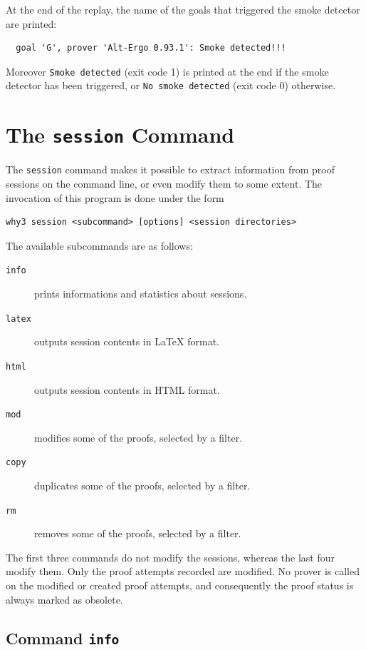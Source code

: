 At the end of the replay, the name of the goals that triggered the
smoke detector are printed:
\begin{verbatim}
  goal 'G', prover 'Alt-Ergo 0.93.1': Smoke detected!!!
\end{verbatim}
Moreover \texttt{Smoke detected} (exit code 1) is printed at the end
if the smoke detector has been triggered, or \texttt{No smoke
  detected} (exit code 0) otherwise.



\section{The \texttt{session} Command}
\label{sec:why3session}

The \texttt{session} command makes it possible to extract information from
proof sessions on the command line, or even modify them to some
extent. The invocation of this program is done under the form
\begin{verbatim}
why3 session <subcommand> [options] <session directories>
\end{verbatim}
The available subcommands are as follows:
\begin{description}
\item[\texttt{info}] prints informations and statistics about sessions.
\item[\texttt{latex}] outputs session contents in LaTeX format.
\item[\texttt{html}] outputs session contents in HTML format.
\item[\texttt{mod}] modifies some of the proofs, selected by a filter.
\item[\texttt{copy}] duplicates some of the proofs, selected by a filter.
\item[\texttt{rm}] removes some of the proofs, selected by a filter.
\end{description}

The first three commands do not modify the sessions, whereas the last
four modify them. Only the proof attempts recorded are modified. No
prover is called on the modified or created proof attempts, and
consequently the proof status is always marked as obsolete.

\subsection{Command \texttt{info}}

